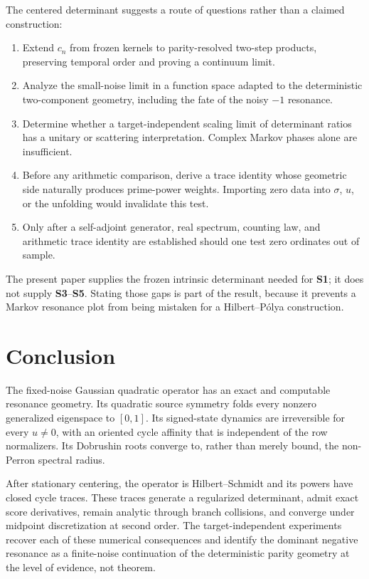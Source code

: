 \documentclass[11pt]{article}
\theoremstyle{definition}
\theoremstyle{remark}
\begin{document}
The centered determinant suggests a route of questions rather than a claimed
construction:
\begin{enumerate}[label=\textbf{S\arabic*.},leftmargin=3.1em]
 \item Extend $c_n$ from frozen kernels to parity-resolved two-step products,
 preserving temporal order and proving a continuum limit.
 \item Analyze the small-noise limit in a function space adapted to the
 deterministic two-component geometry, including the fate of the noisy
 $-1$ resonance.
 \item Determine whether a target-independent scaling limit of determinant
 ratios has a unitary or scattering interpretation.  Complex Markov phases
 alone are insufficient.
 \item Before any arithmetic comparison, derive a trace identity whose
 geometric side naturally produces prime-power weights.  Importing zero data
 into $\sigma$, $u$, or the unfolding would invalidate this test.
 \item Only after a self-adjoint generator, real spectrum, counting law, and
 arithmetic trace identity are established should one test zero ordinates
 out of sample.
\end{enumerate}
The present paper supplies the frozen intrinsic determinant needed for
\textbf{S1}; it does not supply \textbf{S3}--\textbf{S5}.  Stating those gaps
is part of the result, because it prevents a Markov resonance plot from being
mistaken for a Hilbert--P\'olya construction.

\section{Conclusion}

The fixed-noise Gaussian quadratic operator has an exact and computable
resonance geometry.  Its quadratic source symmetry folds every nonzero
generalized eigenspace to $[0,1]$.  Its signed-state dynamics are irreversible
for every $u\ne0$, with an oriented cycle affinity that is independent of the
row normalizers.  Its Dobrushin roots converge to, rather than merely bound,
the non-Perron spectral radius.

After stationary centering, the operator is Hilbert--Schmidt and its powers
have closed cycle traces.  These traces generate a regularized determinant,
admit exact score derivatives, remain analytic through branch collisions, and
converge under midpoint discretization at second order.  The target-independent
experiments recover each of these numerical consequences and identify the
dominant negative resonance as a finite-noise continuation of the deterministic
parity geometry at the level of evidence, not theorem.
\end{document}
